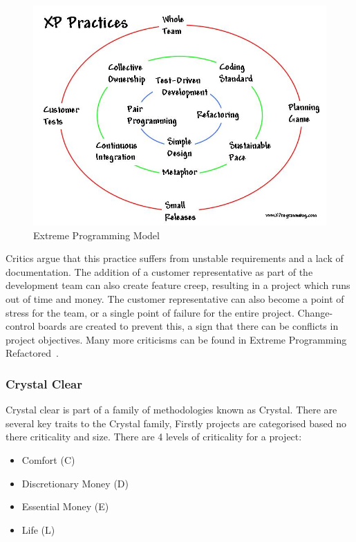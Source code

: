 \documentclass[11pt,a4paper]{article}
\begin{document}
\begin{figure}[H]
\centering
\includegraphics[width = 140mm]{circles.jpg}
\caption{Extreme Programming Model~\cite{xpCircles}}
\label{fig:xp}
\end{figure}

Critics argue that this practice suffers from unstable requirements and a lack of documentation. The addition of a customer representative as part of the development team can also create feature creep, resulting in a project which runs out of time and
money. The customer representative can also become a point of stress for the team, or a single point of failure for the entire project. Change-control boards are created to prevent this, a sign that there can be conflicts in project objectives. Many more criticisms can be found in Extreme Programming Refactored~\cite{xpRefactored}.

\subsubsection{Crystal Clear}
Crystal clear is part of a family of methodologies known as Crystal. There are several key traits to the Crystal family, Firstly projects are categorised based no there criticality and size. There are 4 levels of criticality for a project:

\begin{itemize}
\item Comfort (C)
\item Discretionary Money (D)
\item Essential Money (E)
\item Life (L)
\end{itemize}
\end{document}
